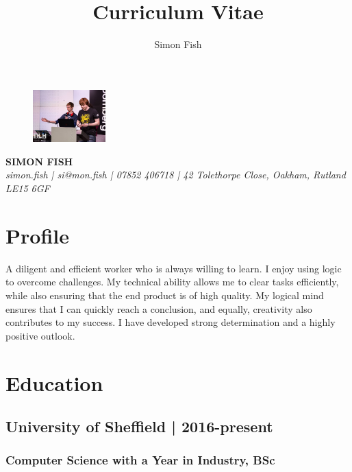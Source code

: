 \documentclass{article}
\begin{document}
\title{Curriculum Vitae}
\author{Simon Fish}

\begin{figure}
	\centering
	\includegraphics[width=0.25\textwidth]{profile}
\end{figure}

\begin{center}
	\color[HTML]{008080}\selectfont\MakeTextUppercase\Large\textbf{SIMON FISH}\\
	\small\textit{simon.fish | si@mon.fish | 07852 406718 | 42 Tolethorpe Close, Oakham, Rutland LE15 6GF}
\end{center}

\section*{Profile}
A diligent and efficient worker who is always willing to learn. I enjoy using logic to
overcome challenges. My technical ability allows me to clear tasks efficiently,
while also ensuring that the end product is of high quality. My logical mind
ensures that I can quickly reach a conclusion, and equally, creativity also
contributes to my success. I have developed strong determination and a highly
positive outlook.

\section*{Education}
\subsection*{University of Sheffield | 2016-present}
\subsubsection*{Computer Science with a Year in Industry, BSc}
\end{document}
